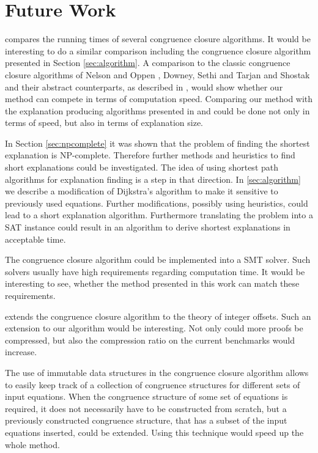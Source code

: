 \section{Future Work}

\cite{Bachmair2000} compares the running times of several congruence closure algorithms.
It would be interesting to do a similar comparison including the congruence closure algorithm presented in Section \ref{sec:algorithm}.
A comparison to the classic congruence closure algorithms of Nelson and Oppen \cite{Nelson1980}, Downey, Sethi and Tarjan \cite{Downey1980} and Shostak \cite{Shostak1978} and their abstract counterparts, as described in \cite{Bachmair2000}, would show whether our method can compete in terms of computation speed.
Comparing our method with the explanation producing algorithms presented in \cite{Fontaine2004} and \cite{Nieuwenhuis2005,Nieuwenhuis2007} could be done not only in terms of speed, but also in terms of explanation size.

In Section \ref{sec:npcomplete} it was shown that the problem of finding the shortest explanation is NP-complete.
Therefore further methods and heuristics to find short explanations could be investigated.
The idea of using shortest path algorithms for explanation finding is a step in that direction.
In \ref{sec:algorithm} we describe a modification of Dijkstra's algorithm \cite{Dijkstra1959} to make it sensitive to previously used equations.
Further modifications, possibly using heuristics, could lead to a short explanation algorithm.
Furthermore translating the problem into a SAT instance could result in an algorithm to derive shortest explanations in acceptable time.

The congruence closure algorithm could be implemented into a SMT solver.
Such solvers usually have high requirements regarding computation time.
It would be interesting to see, whether the method presented in this work can match these requirements.

\cite{Nieuwenhuis2007} extends the congruence closure algorithm to the theory of integer offsets.
Such an extension to our algorithm would be interesting.
Not only could more proofs be compressed, but also the compression ratio on the current benchmarks would increase.

The use of immutable data structures in the congruence closure algorithm allows to easily keep track of a collection of congruence structures for different sets of input equations.
When the congruence structure of some set of equations is required, it does not necessarily have to be constructed from scratch, but a previously constructed congruence structure, that has a subset of the input equations inserted, could be extended.
Using this technique would speed up the whole method.